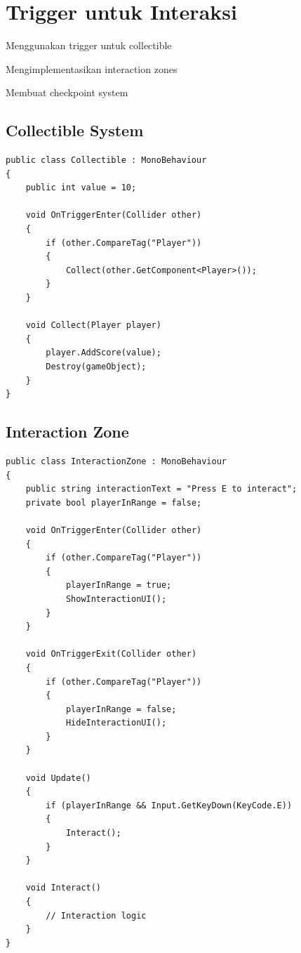 
\section{Trigger untuk Interaksi}

\begin{learningoutcomes}
\item Menggunakan trigger untuk collectible
\item Mengimplementasikan interaction zones
\item Membuat checkpoint system
\end{learningoutcomes}

\subsection{Collectible System}

\begin{lstlisting}[language={[Sharp]C}]
public class Collectible : MonoBehaviour
{
    public int value = 10;
    
    void OnTriggerEnter(Collider other)
    {
        if (other.CompareTag("Player"))
        {
            Collect(other.GetComponent<Player>());
        }
    }
    
    void Collect(Player player)
    {
        player.AddScore(value);
        Destroy(gameObject);
    }
}
\end{lstlisting}

\subsection{Interaction Zone}

\begin{lstlisting}[language={[Sharp]C}]
public class InteractionZone : MonoBehaviour
{
    public string interactionText = "Press E to interact";
    private bool playerInRange = false;
    
    void OnTriggerEnter(Collider other)
    {
        if (other.CompareTag("Player"))
        {
            playerInRange = true;
            ShowInteractionUI();
        }
    }
    
    void OnTriggerExit(Collider other)
    {
        if (other.CompareTag("Player"))
        {
            playerInRange = false;
            HideInteractionUI();
        }
    }
    
    void Update()
    {
        if (playerInRange && Input.GetKeyDown(KeyCode.E))
        {
            Interact();
        }
    }
    
    void Interact()
    {
        // Interaction logic
    }
}
\end{lstlisting}

